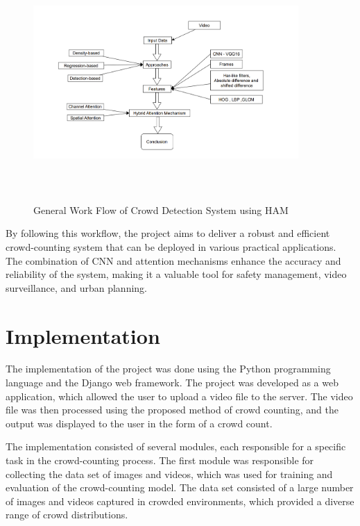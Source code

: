 \documentclass[12pt]{report}
\begin{document}
\begin{figure}[htbp]
  \centering
  \includegraphics [width=0.9\textwidth, height=9cm]{Workflow.png}
  \caption{General Work Flow of Crowd Detection System using HAM}
  \label{fig:image}
\end{figure}

By following this workflow, the project aims to deliver a robust and efficient crowd-counting system that can be deployed in various practical applications. The combination of CNN and attention mechanisms enhance the accuracy and reliability of the system, making it a valuable tool for safety management, video surveillance, and urban planning.
\newline

\section{Implementation}

The implementation of the project was done using the Python programming language and the Django web framework. The project was developed as a web application, which allowed the user to upload a video file to the server. The video file was then processed using the proposed method of crowd counting, and the output was displayed to the user in the form of a crowd count.
\newline

The implementation consisted of several modules, each responsible for a specific task in the crowd-counting process. The first module was responsible for collecting the data set of images and videos, which was used for training and evaluation of the crowd-counting model. The data set consisted of a large number of images and videos captured in crowded environments, which provided a diverse range of crowd distributions.
\newline
\end{document}
